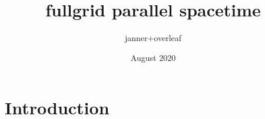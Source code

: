\documentclass{article}
\title{fullgrid parallel spacetime}
\author{janner+overleaf }
\date{August 2020}
\begin{document}
\maketitle

\section{Introduction}
\end{document}
